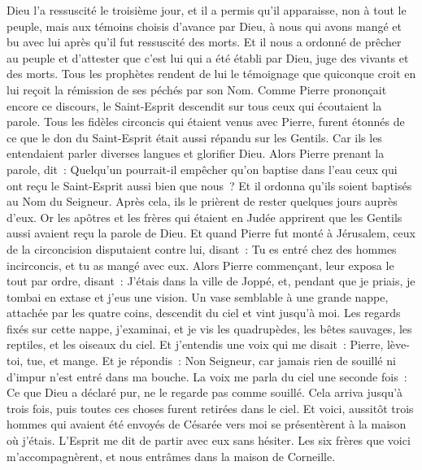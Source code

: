 \begin{multicols}{2}
Dieu l'a ressuscité le troisième jour, et il a permis qu'il apparaisse,
non à tout le peuple, mais aux témoins choisis d'avance par Dieu, à nous qui avons mangé et bu avec lui après qu'il fut ressuscité des morts.
Et il nous a ordonné de prêcher au peuple et d'attester que c'est lui qui a été établi par Dieu, juge des vivants et des morts.
Tous les prophètes rendent de lui le témoignage que quiconque croit en lui reçoit la rémission de ses péchés par son Nom.
Comme Pierre prononçait encore ce discours, le Saint-Esprit descendit sur tous ceux qui écoutaient la parole.
Tous les fidèles circoncis qui étaient venus avec Pierre, furent étonnés de ce que le don du Saint-Esprit était aussi répandu sur les Gentils.
Car ils les entendaient parler diverses langues et glorifier Dieu.
Alors Pierre prenant la parole, dit~: Quelqu'un pourrait-il empêcher qu'on baptise dans l'eau ceux qui ont reçu le Saint-Esprit aussi bien que nous~?
Et il ordonna qu'ils soient baptisés au Nom du Seigneur. Après cela, ils le prièrent de rester quelques jours auprès d'eux.
\VerseOne{}Or les apôtres et les frères qui étaient en Judée apprirent que les Gentils aussi avaient reçu la parole de Dieu.
Et quand Pierre fut monté à Jérusalem, ceux de la circoncision disputaient contre lui,
disant~: Tu es entré chez des hommes incirconcis, et tu as mangé avec eux.
Alors Pierre commençant, leur exposa le tout par ordre, disant~:
J'étais dans la ville de Joppé, et, pendant que je priais, je tombai en extase et j'eus une vision. Un vase semblable à une grande nappe, attachée par les quatre coins, descendit du ciel et vint jusqu'à moi.
Les regards fixés sur cette nappe, j'examinai, et je vis les quadrupèdes, les bêtes sauvages, les reptiles, et les oiseaux du ciel.
Et j'entendis une voix qui me disait~: Pierre, lève-toi, tue, et mange.
Et je répondis~: Non Seigneur, car jamais rien de souillé ni d'impur n'est entré dans ma bouche.
La voix me parla du ciel une seconde fois~: Ce que Dieu a déclaré pur, ne le regarde pas comme souillé.
Cela arriva jusqu'à trois fois, puis toutes ces choses furent retirées dans le ciel.
Et voici, aussitôt trois hommes qui avaient été envoyés de Césarée vers moi se présentèrent à la maison où j'étais.
L'Esprit me dit de partir avec eux sans hésiter. Les six frères que voici m'accompagnèrent, et nous entrâmes dans la maison de Corneille.

\end{multicols}
